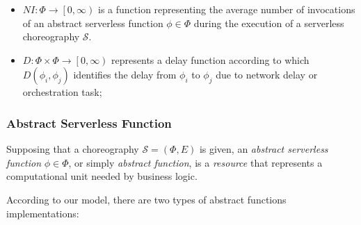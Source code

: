 \begin{itemize}
	\item $NI: \Phi \to \left[ 0, \infty \right)$ is a function representing the average number of invocations of an abstract serverless function $\phi \in \Phi$ during the execution of a serverless choreography $\mathcal{S}$.
	
	\item $D : \Phi \times \Phi \to \left[ 0, \infty \right)$ represents a delay function according to which $D\left(\phi_i, \phi_j \right)$ identifies the delay from $\phi_i$ to $\phi_j$ due to network delay or orchestration task;  
	
\end{itemize}

\subsubsection{Abstract Serverless Function}

Supposing that a choreography $\mathcal{S} = (\Phi,E)$ is given, an \textit{abstract serverless function} $\phi \in \Phi$, or simply \textit{abstract function}, is a \textit{resource} that represents a computational unit needed by business logic. 

According to our model, there are two types of abstract functions implementations:

